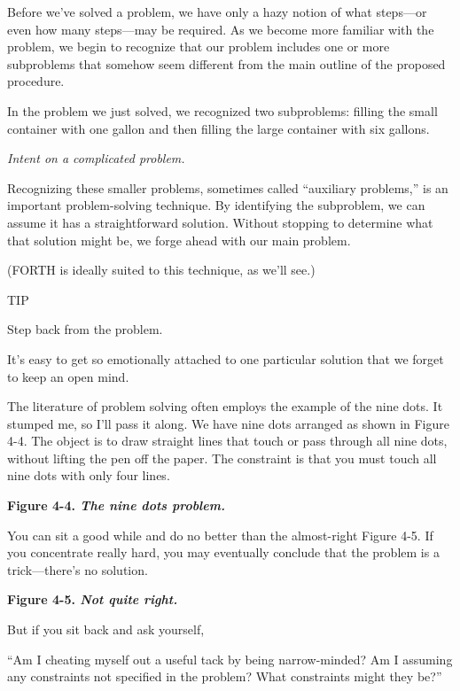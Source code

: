 Before we've solved a problem, we have only a hazy notion of what
steps---or even how many steps---may be required. As we become more
familiar with the problem, we begin to recognize that our problem
includes one or more subproblems that somehow seem different from the
main outline of the proposed procedure.

In the problem we just solved, we recognized two subproblems: filling
the small container with one gallon and then filling the large container
with six gallons.


\emph{Intent on a complicated problem.}

Recognizing these smaller problems, sometimes called ``auxiliary
problems,'' is an important problem-solving technique. By identifying
the subproblem, we can assume it has a straightforward solution.
Without stopping to determine what that solution might be, we forge
ahead with our main problem.

(FORTH is ideally suited to this technique, as we'll see.)

TIP

Step back from the problem.

It's easy to get so emotionally attached to one particular solution that we
forget to keep an open mind.

The literature of problem solving often employs the example of the
nine dots. It stumped me, so I'll pass it along. We have nine dots arranged
as shown in Figure 4-4. The object is to draw straight lines that
touch or pass through all nine dots, without lifting the pen off the paper.
The constraint is that you must touch all nine dots with only four lines.

\bf{Figure 4-4.} \emph{The nine dots problem.}


You can sit a good while and do no better than the almost-right
Figure 4-5. If you concentrate really hard, you may eventually conclude
that the problem is a trick---there's no solution.

\bf{Figure 4-5.} \emph{Not quite right.}


But if you sit back and ask yourself,

``Am I cheating myself out a useful tack by being narrow-minded? Am I
assuming any constraints not specified in the problem? What constraints
might they be?''

